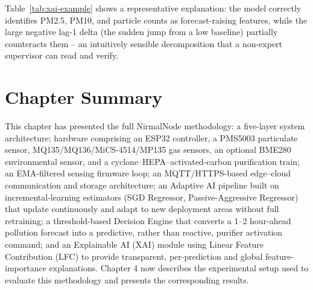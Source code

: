 \noindent Table~\ref{tab:xai-example} shows a representative explanation: the model correctly identifies PM2.5, PM10, and particle counts as forecast-raising features, while the large negative lag-1 delta (the sudden jump from a low baseline) partially counteracts them -- an intuitively sensible decomposition that a non-expert supervisor can read and verify.

\FloatBarrier

\section{Chapter Summary}
\label{sec:meth-summary}

This chapter has presented the full NirmalNode methodology: a five-layer system architecture; hardware comprising an ESP32 controller, a PMS5003 particulate sensor, MQ135/MQ136/MiCS-4514/MP135 gas sensors, an optional BME280 environmental sensor, and a cyclone--HEPA--activated-carbon purification train; an EMA-filtered sensing firmware loop; an MQTT/HTTPS-based edge--cloud communication and storage architecture; an Adaptive AI pipeline built on incremental-learning estimators (SGD Regressor, Passive-Aggressive Regressor) that update continuously and adapt to new deployment areas without full retraining; a threshold-based Decision Engine that converts a 1--2 hour-ahead pollution forecast into a predictive, rather than reactive, purifier activation command; and an Explainable AI (XAI) module using Linear Feature Contribution (LFC) to provide transparent, per-prediction and global feature-importance explanations. Chapter 4 now describes the experimental setup used to evaluate this methodology and presents the corresponding results.

